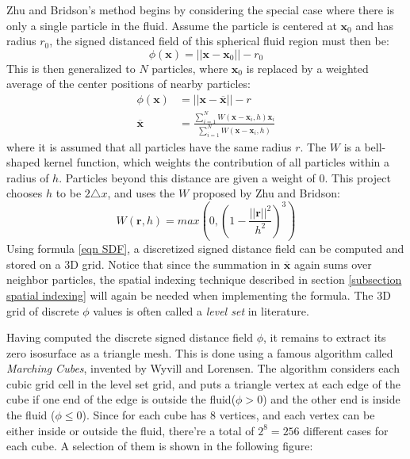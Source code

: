 Zhu and Bridson's method\cite{zhu2005animating} begins by considering the special case where there is only a single particle in the fluid. Assume the particle is centered at $\textbf{x}_0$ and has radius $r_0$, the signed distanced field of this spherical fluid region must then be:
$$
\phi(\textbf{x}) = ||\textbf{x}-\textbf{x}_0|| - r_0
$$
This is then generalized to $N$ particles, where $\textbf{x}_0$ is replaced by a weighted average of the center positions of nearby particles:
\begin{equation}
    \label{eqn SDF}
    \begin{aligned}
        \phi(\textbf{x}) &= ||\textbf{x}-\overline{\textbf{x}}|| - r \\
        \overline{\textbf{x}}&= \frac{\sum_{i=1}^{N} W(\textbf{x}-\textbf{x}_i,h)\textbf{x}_i}{\sum_{i=1}^{N} W(\textbf{x}-\textbf{x}_i,h)}
    \end{aligned}
\end{equation}
where it is assumed that all particles have the same radius $r$. The $W$ is a bell-shaped kernel function, which weights the contribution of all particles within a radius of $h$. Particles beyond this distance are given a weight of $0$. This project chooses $h$ to be $2\triangle x$, and uses the $W$ proposed by Zhu and Bridson:
$$
W(\textbf{r},h) = max(0,(1-\frac{||\textbf{r}||^2}{h^2})^3) 
$$
Using formula \ref{eqn SDF}, a discretized signed distance field can be computed and stored on a 3D grid. Notice that since the summation in $\overline{\textbf{x}}$ again sums over neighbor particles, the spatial indexing technique described in section \ref{subsection spatial indexing} will again be needed when implementing the formula. The 3D grid of discrete $\phi$ values is often called a \textit{level set} in literature\cite{bridson2015fluid}.


Having computed the discrete signed distance field $\phi$, it remains to extract its zero isosurface as a triangle mesh. This is done using a famous algorithm called \textit{Marching Cubes}, invented by Wyvill\cite{wyvill1986soft} and Lorensen\cite{lorensen1987marching}. The algorithm considers each cubic grid cell in the level set grid, and puts a triangle vertex at each edge of the cube if one end of the edge is outside the fluid($\phi>0$) and the other end is inside the fluid ($\phi\leq 0$). Since for each cube has 8 vertices, and each vertex can be either inside or outside the fluid, there're a total of $2^8=256$ different cases for each cube. A selection of them is shown in the following figure:

